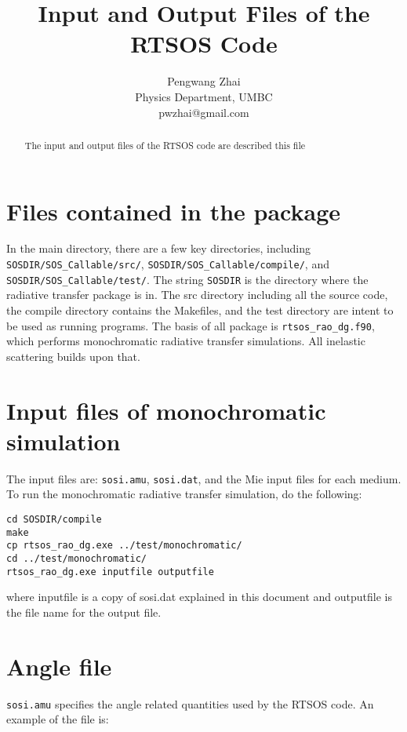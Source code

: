 \documentclass[10pt,letterpaper]{article}
\title{Input and Output Files of the RTSOS Code}
\author{Pengwang Zhai \\ Physics Department, UMBC \\ pwzhai@gmail.com}
\begin{document}
\maketitle

\begin{abstract}
The input and output files of the RTSOS code are described this file
\end{abstract}


\section{Files contained in the package}
In the main directory, there are a few key directories, including \verb"SOSDIR/SOS_Callable/src/", \verb"SOSDIR/SOS_Callable/compile/", and \verb"SOSDIR/SOS_Callable/test/". The string \verb"SOSDIR" is the directory where the radiative transfer package is in. The src directory including all the source code, the compile directory contains the Makefiles, and the test directory are intent to be used as running programs. The basis of all package is \verb"rtsos_rao_dg.f90", which performs monochromatic radiative transfer simulations. All inelastic scattering builds upon that.

\section{Input files of monochromatic simulation}
The input files are: \verb"sosi.amu", \verb"sosi.dat",  and the Mie input files for each medium. To run the monochromatic radiative transfer simulation, do the following:

\begin{verbatim}
cd SOSDIR/compile
make
cp rtsos_rao_dg.exe ../test/monochromatic/
cd ../test/monochromatic/
rtsos_rao_dg.exe inputfile outputfile
\end{verbatim}

where inputfile is a copy of sosi.dat explained in this document and outputfile is the file name for the output file.

\section{Angle file}
\verb"sosi.amu" specifies the angle related quantities used by the RTSOS code.  An example of the file is:
\end{document}

